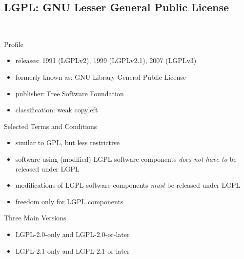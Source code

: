 \subsection{LGPL: GNU Lesser General Public License}
\begin{frame}{\insertsubsection\ }
	\begin{fancycolumns}
		\begin{definition}{Profile}
			\begin{itemize}
				\item releases: 1991 (LGPLv2), 1999 (LGPLv2.1), 2007 (LGPLv3)
				\item formerly known as: GNU Library General Public License
				\item publisher: Free Software Foundation
				\item classification: weak copyleft
			\end{itemize}
		\end{definition}
		\begin{example}{Selected Terms and Conditions}
			\begin{itemize}
				\item similar to GPL, but less restrictive
				\item software using (modified) LGPL software components \emph{does not have to} be released under LGPL
				\item modifications of LGPL software components \emph{must} be released under LGPL %
				\item freedom only for LGPL components
			\end{itemize}
		\end{example}
		\nextcolumn
		\begin{exampletight}{}
			\centering{}
		\end{exampletight}
		\begin{note}{Three Main Versions}
			\begin{itemize}
				\item LGPL-2.0-only and LGPL-2.0-or-later
				\item LGPL-2.1-only and LGPL-2.1-or-later

\end{itemize}
\end{note}
\end{fancycolumns}
\end{frame}
